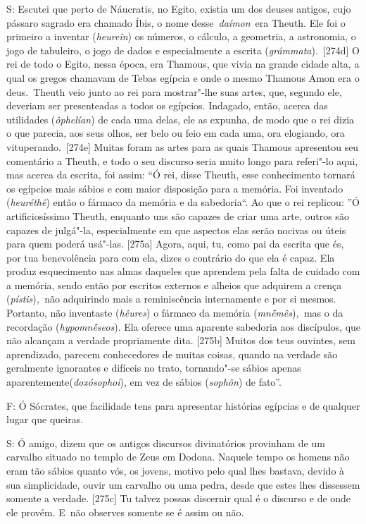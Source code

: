 S: Escutei que perto de Náucratis, no Egito, existia um dos deuses
antigos, cujo pássaro sagrado era chamado Íbis, o nome
desse~\emph{daímon}~era Theuth. Ele foi o primeiro a inventar
(\emph{heureîn}) os números, o cálculo, a geometria, a astronomia, o
jogo de tabuleiro, o jogo de dados e especialmente a escrita
(\emph{grámmata}).~[274d] O rei de todo o Egito, nessa época, era
Thamous, que vivia na grande cidade alta, a qual os gregos chamavam de
Tebas egípcia e onde o mesmo Thamous Amon era o deus.~Theuth veio junto
ao rei para mostrar"-lhe suas artes, que, segundo ele, deveriam ser
presenteadas a todos os egípcios. Indagado, então, acerca das utilidades
(\emph{ôphelían}) de cada uma delas, ele as expunha, de modo que o rei
dizia o que parecia, aos seus olhos, ser belo ou feio em cada uma, ora
elogiando, ora vituperando.~[274e] Muitas foram as artes para as
quais Thamous apresentou seu comentário a Theuth, e todo o seu discurso
seria muito longo para referi"-lo aqui, mas acerca da escrita, foi assim:
``Ó rei, disse Theuth, esse conhecimento tornará os egípcios mais sábios
e com maior disposição para a memória. Foi inventado (\emph{heuréthê})
então o fármaco da memória e da sabedoria``. Ao que o rei replicou: ''Ó
artificiosíssimo Theuth, enquanto uns são capazes de criar uma arte,
outros são capazes de julgá"-la, especialmente em que aspectos elas serão
nocivas ou úteis para quem poderá usá"-las. [275a] Agora, aqui, tu,
como pai da escrita que és, por tua benevolência para com ela, dizes o
contrário do que ela é capaz. Ela produz esquecimento nas almas daqueles
que aprendem pela falta de cuidado com a memória, sendo então por
escritos externos e alheios que adquirem a crença
(\emph{pístis})\emph{,~}não adquirindo mais a reminiscência internamente
e por si mesmos. Portanto, não inventaste (\emph{hêures}) o fármaco da
memória (\emph{mnḗmês})\emph{,~}mas o da recordação
(\emph{hypomnḗseos}). Ela oferece uma aparente sabedoria aos discípulos,
que não alcançam a verdade propriamente dita. [275b] Muitos dos teus
ouvintes, sem aprendizado, parecem conhecedores de muitas coisas, quando
na verdade são geralmente ignorantes e difíceis no trato, tornando"-se
sábios apenas aparentemente(\emph{doxósophoi}), em vez de sábios
(\emph{sophôn}) de fato''.

 

F: Ó Sócrates, que facilidade tens para apresentar histórias egípcias e
de qualquer lugar que queiras.

 

S: Ó amigo, dizem que os antigos discursos divinatórios provinham de um
carvalho situado no templo de Zeus em Dodona. Naquele tempo os homens
não eram tão sábios quanto vós, os jovens, motivo pelo qual lhes
bastava, devido à sua simplicidade, ouvir um carvalho ou uma pedra,
desde que estes lhes dissessem somente a verdade. [275c] Tu talvez
possas discernir qual é o discurso e de onde ele provém. E~não observes
somente se é assim ou não.

